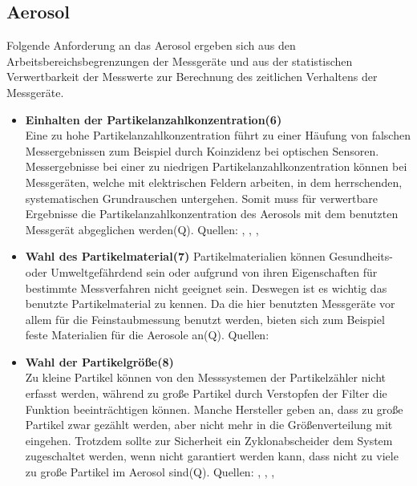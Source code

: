 \subsection{Aerosol}
Folgende Anforderung an das Aerosol ergeben sich aus den Arbeitsbereichsbegrenzungen der Messger\"{a}te und aus der statistischen Verwertbarkeit der Messwerte zur Berechnung des zeitlichen Verhaltens der Messger\"{a}te.

\begin{itemize}
\item \textbf{Einhalten der Partikelanzahlkonzentration(6)}\\
Eine zu hohe Partikelanzahlkonzentration f\"{u}hrt zu einer H\"{a}ufung von falschen Messergebnissen zum Beispiel durch Koinzidenz bei optischen Sensoren. Messergebnisse bei einer zu niedrigen Partikelanzahlkonzentration k\"{o}nnen bei Messger\"{a}ten, welche mit elektrischen Feldern arbeiten, in dem herrschenden, systematischen Grundrauschen untergehen. Somit muss f\"{u}r verwertbare Ergebnisse die Partikelanzahlkonzentration des Aerosols mit dem benutzten Messger\"{a}t abgeglichen werden(Q).
Quellen: \cite{fmps_3091}, \cite{ops_3330}, \cite{aps_3321}, \cite{ucpc_3776}

\item \textbf{Wahl des Partikelmaterial(7)} 
Partikelmaterialien k\"{o}nnen Gesundheits- oder Umweltgef\"{a}hrdend sein oder aufgrund von ihren Eigenschaften f\"{u}r bestimmte Messverfahren nicht geeignet sein. Deswegen ist es wichtig das benutzte Partikelmaterial zu kennen. Da die hier benutzten Messger\"{a}te vor allem f\"{u}r die Feinstaubmessung benutzt werden, bieten sich zum Beispiel feste Materialien f\"{u}r die Aerosole an(Q).
Quellen: \cite{vdi3491}

\item \textbf{Wahl der Partikelgr\"{o}{\ss}e(8)}\\ 
Zu kleine Partikel k\"{o}nnen von den Messsystemen der Partikelz\"{a}hler nicht erfasst werden, w\"{a}hrend zu gro{\ss}e Partikel durch Verstopfen der Filter die Funktion beeintr\"{a}chtigen k\"{o}nnen. Manche Hersteller geben an, dass zu gro{\ss}e Partikel zwar gez\"{a}hlt werden, aber nicht mehr in die Gr\"{o}{\ss}enverteilung mit eingehen. Trotzdem sollte zur Sicherheit ein Zyklonabscheider dem System zugeschaltet werden, wenn nicht garantiert werden kann, dass nicht zu viele zu gro{\ss}e Partikel im Aerosol sind(Q).
Quellen: \cite{fmps_3091}, \cite{ops_3330}, \cite{aps_3321}, \cite{ucpc_3776}
\end{itemize}

